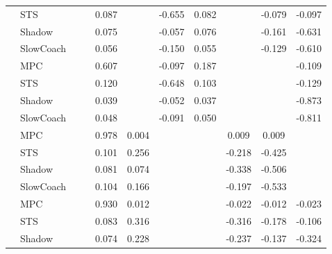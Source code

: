\begin{tabular}{|l|l|*{9}{c|}}
                                                           & STS &       &        &     0.087 &     & -0.655 &  0.082 &      &  -0.079 &   -0.097 \\
                                                           & Shadow &       &        &     0.075 &     & -0.057 &  0.076 &      &  -0.161 &   -0.631 \\
                                                           & SlowCoach &       &        &     0.056 &     & -0.150 &  0.055 &      &  -0.129 &   -0.610 \\
\midrule
[False, False, True, False, True, True, False, False, True] & MPC &       &        &     0.607 &     & -0.097 &  0.187 &      &      &   -0.109 \\
                                                           & STS &       &        &     0.120 &     & -0.648 &  0.103 &      &      &   -0.129 \\
                                                           & Shadow &       &        &     0.039 &     & -0.052 &  0.037 &      &      &   -0.873 \\
                                                           & SlowCoach &       &        &     0.048 &     & -0.091 &  0.050 &      &      &   -0.811 \\
\midrule
[False, False, True, True, False, False, True, True, False] & MPC &       &        &     0.978 &  0.004 &     &     &   0.009 &   0.009 &       \\
                                                           & STS &       &        &     0.101 &  0.256 &     &     &  -0.218 &  -0.425 &       \\
                                                           & Shadow &       &        &     0.081 &  0.074 &     &     &  -0.338 &  -0.506 &       \\
                                                           & SlowCoach &       &        &     0.104 &  0.166 &     &     &  -0.197 &  -0.533 &       \\
\midrule
[False, False, True, True, False, False, True, True, True] & MPC &       &        &     0.930 &  0.012 &     &     &  -0.022 &  -0.012 &   -0.023 \\
                                                           & STS &       &        &     0.083 &  0.316 &     &     &  -0.316 &  -0.178 &   -0.106 \\
                                                           & Shadow &       &        &     0.074 &  0.228 &     &     &  -0.237 &  -0.137 &   -0.324 \\

\end{tabular}
